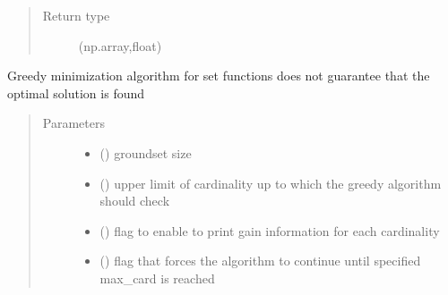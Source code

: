 \documentclass[letterpaper,10pt,english]{sphinxmanual}
\begin{document}
\begin{fulllineitems}
\begin{fulllineitems}
\begin{quote}
\begin{description}
\item[{Return type}] \leavevmode
\sphinxAtStartPar
(np.array,float)

\end{description}\end{quote}

\end{fulllineitems}


\begin{fulllineitems}
\label{\detokenize{setFTs:setFTs.setfunctions.SetFunction.minimize_greedy}}
\sphinxAtStartPar
Greedy minimization algorithm for set functions does not guarantee that the optimal solution is found
\begin{quote}\begin{description}
\item[{Parameters}] \leavevmode\begin{itemize}
\item {} 
\sphinxAtStartPar
{} () \textendash{} groundset size

\item {} 
\sphinxAtStartPar
{} () \textendash{} upper limit of cardinality up to which the greedy algorithm should check

\item {} 
\sphinxAtStartPar
{} () \textendash{} flag to enable to print gain information for each cardinality

\item {} 
\sphinxAtStartPar
{} () \textendash{} flag that forces the algorithm to continue until specified max\_card is reached

\end{itemize}


\end{description}
\end{quote}
\end{fulllineitems}
\end{fulllineitems}
\end{document}
